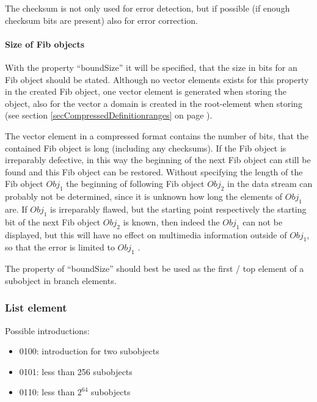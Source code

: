 The checksum is not only used for error detection, but if possible (if enough checksum bits are present) also for error correction.




\paragraph{Size of Fib objects}
\label{secCompressedBoundSize}

With the property ``boundSize'' it will be specified, that the size in bits for an Fib object should be stated. Although no vector elements exists for this property in the created Fib object, one vector element is generated when storing the object, also for the vector a domain is created in the root-element when storing (see section \ref{secCompressedDefinitionranges} on page \pageref{secCompressedDefinitionranges}).

The vector element in a compressed format contains the number of bits, that the contained Fib object is long (including any checksums). If the Fib object is irreparably defective, in this way the beginning of the next Fib object can still be found and this Fib object can be restored. Without specifying the length of the Fib object $Obj_1$ the beginning of following Fib object $Obj_2$ in the data stream can probably not be determined, since it is unknown how long the elements of $Obj_1$ are. If $Obj_1$ is irreparably flawed, but the starting point respectively the starting bit of the next Fib object $Obj_2$ is known, then indeed the $Obj_1$ can not be displayed, but this will have no effect on multimedia information outside of $Obj_1$, so that the error is limited to $Obj_1$ .

The property of ``boundSize'' should best be used as the first / top element of a subobject in branch elements.



\subsubsection{List element}

Possible introductions:
\begin{itemize}
 \item 0100: introduction for two subobjects
 \item 0101: less than 256 subobjects
 \item 0110: less than $2^{64}$ subobjects
\end{itemize}

